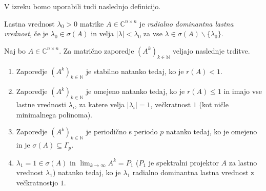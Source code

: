 \documentclass[mat1]{fmfdelo}
\newcommand{\N}{\mathbb N}
\newcommand{\C}{\mathbb C}
\begin{document}
V izreku bomo uporabili tudi naslednjo definicijo.
\begin{definicija}
    Lastna vrednost $\lambda_0 > 0$ matrike $A \in \C^{n \times n}$ je \emph{radialno dominantna lastna vrednost}, če je $\lambda_0 \in \sigma(A)$ in velja $|\lambda| < \lambda_0$ za vse $\lambda \in \sigma(A) \backslash \{\lambda_0\}$.
\end{definicija}
\begin{izrek}\label{izrekAsimptotika}
    Naj bo $A \in \C^{n \times n}$. Za matrično zaporedje $(A^k)_{k\in\N}$ veljajo naslednje trditve.
    \begin{enumerate}
        \item Zaporedje $(A^k)_{k\in\N}$ je stabilno natanko tedaj, ko je $r(A) < 1$.
        \item Zaporedje $(A^k)_{k\in\N}$ je omejeno natanko tedaj, ko je $r(A) \leq 1$ in imajo vse lastne vrednosti $\lambda_i$, za katere velja $|\lambda_i| = 1$, večkratnost $1$ (kot ničle minimalnega polinoma).
        \item Zaporedje $(A^k)_{k\in\N}$ je periodično s periodo $p$ natanko tedaj, ko je omejeno in je $\sigma(A) \subseteq \Gamma_p$.
        \item $\lambda_1 = 1 \in \sigma(A)$ in $\lim_{k\rightarrow\infty} A^k = P_1$ ($P_1$ je spektralni projektor $A$ za lastno vrednost $\lambda_1$) natanko tedaj, ko je $\lambda_1$ radialno dominantna lastna vrednost z večkratnostjo $1$.
    \end{enumerate}
\end{izrek}
\end{document}
